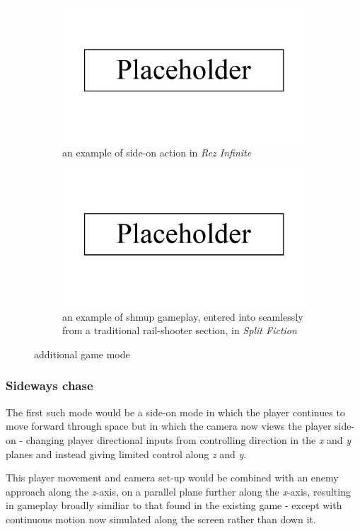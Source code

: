 \documentclass[11pt]{article}
\begin{document}
\begin{figure}[h]
\begin{subfigure}{.45\textwidth}
  \centering
  \includegraphics[width=.8\linewidth]{placeholder}
  \caption{an example of side-on action in \textit{Rez Infinite}}
  \label{fig:sideways}
\end{subfigure}\hfill
\begin{subfigure}{.45\textwidth}
  \centering
  \includegraphics[width=.8\linewidth]{placeholder}
  \caption{an example of shmup gameplay, entered into seamlessly from a traditional rail-shooter section, in \textit{Split Fiction}}
  \label{fig:shmup}
\end{subfigure}\hfill
\caption{additional game mode}
\label{fig:additionalmodes}
\end{figure}

\subsubsection*{Sideways chase}
The first such mode would be a side-on mode in which the player continues to move forward
through space but in which the camera now views the player side-on - changing player directional
inputs from controlling direction in the \textit{x} and \textit{y} planes and instead giving
limited control along \textit{z} and \textit{y}.

This player movement and camera set-up would be combined with an enemy approach along the
\textit{z}-axis, on a parallel plane further along the \textit{x}-axis, resulting in gameplay
broadly similiar to that found in the existing game - except with continuous motion now
simulated along the screen rather than down it.
\end{document}
